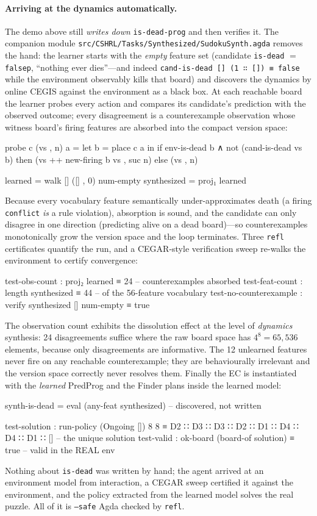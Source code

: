 \documentclass[9pt,a4paper]{article}
\newcommand{\fpath}[1]{\nolinkurl{#1}}
\theoremstyle{plain}
\theoremstyle{definition}
\theoremstyle{remark}
\begin{document}
\paragraph{Arriving at the dynamics automatically.}  The demo above still \emph{writes down} \texttt{is-dead-prog} and then verifies it.  The companion module \fpath{src/CSHRL/Tasks/Synthesized/SudokuSynth.agda} removes the hand: the learner starts with the \emph{empty} feature set (candidate \texttt{is-dead} $=$ \texttt{falsep}, ``nothing ever dies''---and indeed \texttt{cand-is-dead [] (1 ∷ []) ≡ false} while the environment observably kills that board) and discovers the dynamics by online CEGIS against the environment as a black box.  At each reachable board the learner probes every action and compares its candidate's prediction with the observed outcome; every disagreement is a counterexample observation whose witness board's firing features are absorbed into the compact version space:
\begin{spec}
probe c (vs , n) a = let b = place c a in
  if env-is-dead b ∧ not (cand-is-dead vs b)
    then (vs ++ new-firing b vs , suc n)  else (vs , n)

learned      = walk [] ([] , 0) num-empty
synthesized  = proj₁ learned
\end{spec}
Because every vocabulary feature semantically under-approximates death (a firing \texttt{conflict} \emph{is} a rule violation), absorption is sound, and the candidate can only disagree in one direction (predicting alive on a dead board)---so counterexamples monotonically grow the version space and the loop terminates.  Three \texttt{refl} certificates quantify the run, and a CEGAR-style verification sweep re-walks the environment to certify convergence:
\begin{spec}
test-obs-count  : proj₂ learned ≡ 24            -- counterexamples absorbed
test-feat-count : length synthesized ≡ 44       -- of the 56-feature vocabulary
test-no-counterexample : verify synthesized [] num-empty ≡ true
\end{spec}
The observation count exhibits the dissolution effect at the level of \emph{dynamics} synthesis: 24 disagreements suffice where the raw board space has $4^8 = 65{,}536$ elements, because only disagreements are informative.  The 12 unlearned features never fire on any reachable counterexample; they are behaviourally irrelevant and the version space correctly never resolves them.  Finally the EC is instantiated with the \emph{learned} PredProg and the Finder plans inside the learned model:
\begin{spec}
synth-is-dead = eval (any-feat synthesized)     -- discovered, not written

test-solution : run-policy (Ongoing []) 8 8
  ≡ D2 ∷ D3 ∷ D3 ∷ D2 ∷ D1 ∷ D4 ∷ D4 ∷ D1 ∷ []   -- the unique solution
test-valid    : ok-board (board-of solution) ≡ true   -- valid in the REAL env
\end{spec}
Nothing about \texttt{is-dead} was written by hand; the agent arrived at an environment model from interaction, a CEGAR sweep certified it against the environment, and the policy extracted from the learned model solves the real puzzle.  All of it is \texttt{--safe} Agda checked by \texttt{refl}.
\end{document}
